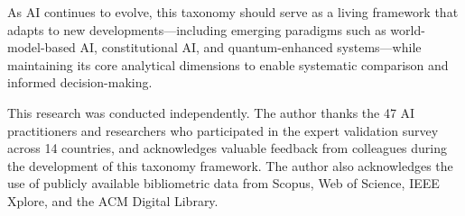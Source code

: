 \documentclass[acmsmall,screen,review]{acmart}
\begin{document}
As AI continues to evolve, this taxonomy should serve as a living framework that adapts to new developments---including emerging paradigms such as world-model-based AI, constitutional AI, and quantum-enhanced systems---while maintaining its core analytical dimensions to enable systematic comparison and informed decision-making.

\begin{acks}
This research was conducted independently. The author thanks the 47 AI practitioners and researchers who participated in the expert validation survey across 14 countries, and acknowledges valuable feedback from colleagues during the development of this taxonomy framework. The author also acknowledges the use of publicly available bibliometric data from Scopus, Web of Science, IEEE Xplore, and the ACM Digital Library.
\end{acks}



\end{document}
